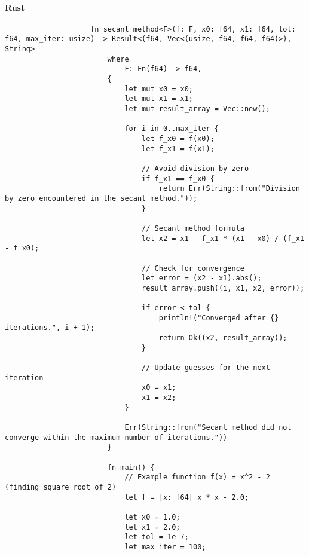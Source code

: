 \documentclass{article}
\begin{document}
            \paragraph{Rust}
                \begin{verbatim}
                    fn secant_method<F>(f: F, x0: f64, x1: f64, tol: f64, max_iter: usize) -> Result<(f64, Vec<(usize, f64, f64, f64)>), String>
                        where
                            F: Fn(f64) -> f64,
                        {
                            let mut x0 = x0;
                            let mut x1 = x1;
                            let mut result_array = Vec::new();

                            for i in 0..max_iter {
                                let f_x0 = f(x0);
                                let f_x1 = f(x1);

                                // Avoid division by zero
                                if f_x1 == f_x0 {
                                    return Err(String::from("Division by zero encountered in the secant method."));
                                }

                                // Secant method formula
                                let x2 = x1 - f_x1 * (x1 - x0) / (f_x1 - f_x0);

                                // Check for convergence
                                let error = (x2 - x1).abs();
                                result_array.push((i, x1, x2, error));

                                if error < tol {
                                    println!("Converged after {} iterations.", i + 1);
                                    return Ok((x2, result_array));
                                }

                                // Update guesses for the next iteration
                                x0 = x1;
                                x1 = x2;
                            }

                            Err(String::from("Secant method did not converge within the maximum number of iterations."))
                        }

                        fn main() {
                            // Example function f(x) = x^2 - 2 (finding square root of 2)
                            let f = |x: f64| x * x - 2.0;

                            let x0 = 1.0;
                            let x1 = 2.0;
                            let tol = 1e-7;
                            let max_iter = 100;


\end{verbatim}
\end{document}
